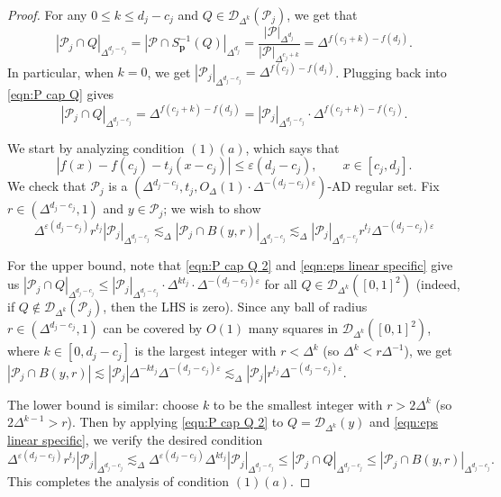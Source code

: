 \documentclass{amsart}
\newcommand{\eps}{\varepsilon}
\newcommand{\lesim}{\lesssim}
\newcommand{\bp}{\mathbf{p}}
\newcommand{\cD}{\mathcal{D}}
\newcommand{\cP}{\mathcal{P}}
\begin{document}
\begin{proof}
For any $0 \le k \le d_j - c_j$ and $Q \in \cD_{\Delta^k} (\cP_j)$, we get that
\begin{equation}\label{eqn:P cap Q}
    |\cP_j \cap Q|_{\Delta^{d_j-c_j}} = |\cP \cap S_\bp^{-1} (Q)|_{\Delta^{d_j}} = \frac{|\cP|_{\Delta^{d_j}}}{|\cP|_{\Delta^{c_j+k}}} = \Delta^{f(c_j + k) - f(d_j)}.
\end{equation}
In particular, when $k = 0$, we get $|\cP_j|_{\Delta^{d_j-c_j}} = \Delta^{f(c_j) - f(d_j)}$. Plugging back into \eqref{eqn:P cap Q} gives
\begin{equation}\label{eqn:P cap Q 2}
    |\cP_j \cap Q|_{\Delta^{d_j-c_j}} = \Delta^{f(c_j+k) - f(d_j)} = |\cP_j|_{\Delta^{d_j-c_j}} \cdot \Delta^{f(c_j+k) - f(c_j)}.
\end{equation}

We start by analyzing condition $(1)(a)$, which says that
\begin{equation}\label{eqn:eps linear specific}
    |f(x) - f(c_j) - t_j (x - c_j)| \le \eps (d_j - c_j), \qquad x \in [c_j, d_j].
\end{equation}
We check that $\cP_j$ is a $(\Delta^{d_j-c_j}, t_j, O_\Delta (1) \cdot \Delta^{-(d_j-c_j)\eps})$-AD regular set. Fix $r \in (\Delta^{d_j-c_j}, 1)$ and $y \in \cP_j$; we wish to show
\[
\Delta^{\eps (d_j-c_j)} r^{t_j} |\cP_j|_{\Delta^{d_j-c_j}} \lesim_\Delta |\cP_j \cap B(y, r)|_{\Delta^{d_j-c_j}} \lesim_\Delta |\cP_j|_{\Delta^{d_j-c_j}} r^{t_j} \Delta^{-(d_j-c_j)\eps}
\]

For the upper bound, note that \eqref{eqn:P cap Q 2} and \eqref{eqn:eps linear specific} give us $|\cP_j \cap Q|_{\Delta^{d_j-c_j}} \le |\cP_j|_{\Delta^{d_j-c_j}} \cdot \Delta^{k t_j} \cdot \Delta^{-(d_j-c_j)\eps}$ for all $Q \in \cD_{\Delta^k} ([0,1]^2)$ (indeed, if $Q \notin \cD_{\Delta^k} (\cP_j)$, then the LHS is zero). Since any ball of radius $r \in (\Delta^{d_j-c_j}, 1)$ can be covered by $O(1)$ many squares in $\cD_{\Delta^k} ([0,1]^2)$, where $k \in [0, d_j - c_j]$ is the largest integer with $r < \Delta^k$ (so $\Delta^k < r \Delta^{-1}$), we get $|\cP_j \cap B(y, r)| \lesim |\cP_j| \Delta^{-kt_j} \Delta^{-(d_j-c_j)\eps} \lesim_\Delta |\cP_j| r^{t_j} \Delta^{-(d_j-c_j)\eps}$.

The lower bound is similar: choose $k$ to be the smallest integer with $r > 2\Delta^k$ (so $2\Delta^{k-1} > r$). Then by applying \eqref{eqn:P cap Q 2} to $Q = \cD_{\Delta^k} (y)$ and \eqref{eqn:eps linear specific}, we verify the desired condition
\begin{equation*}
    \Delta^{\eps (d_j-c_j)} r^{t_j} |\cP_j|_{\Delta^{d_j-c_j}} \lesim_\Delta \Delta^{\eps (d_j-c_j)} \Delta^{k t_j} |\cP_j|_{\Delta^{d_j-c_j}} \le |\cP_j \cap Q|_{\Delta^{d_j-c_j}} \le |\cP_j \cap B(y, r)|_{\Delta^{d_j-c_j}}.
\end{equation*}
This completes the analysis of condition $(1)(a)$.


\end{proof}
\end{document}

